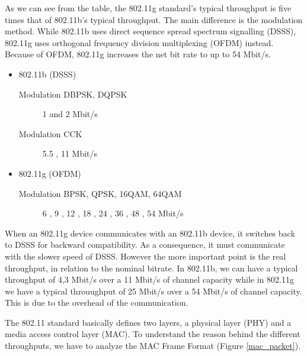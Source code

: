 	As we can see from the table, the 802.11g standard's typical throughput is five times that of 802.11b's typical throughput.  The main difference is the modulation method.  While 802.11b uses direct sequence spread spectrum signalling (DSSS), 802.11g uses orthogonal frequency division multiplexing (OFDM) instead.  Because of OFDM, 802.11g increases the net bit rate to up to 54 Mbit/s.
	
	\begin{itemize}
		\item 802.11b (DSSS)
			\begin{description}
				\item[Modulation DBPSK, DQPSK] 1 and 2 Mbit/s
				\item[Modulation CCK] 5.5 , 11 Mbit/s
			\end{description}
		\item 802.11g (OFDM)
			\begin{description}
				\item[Modulation BPSK, QPSK, 16QAM, 64QAM] 6 , 9 , 12 , 18 , 24 , 36 , 48 , 54 Mbit/s
			\end{description}
	\end{itemize}

	When an 802.11g device communicates with an 802.11b device, it switches back to DSSS for backward compatibility. As a consequence, it must communicate with the slower speed of DSSS.
	However the more important point is the real throughput, in relation to the nominal bitrate.
	In 802.11b, we can have a typical throughput of 4,3 Mbit/s over a 11 Mbit/s of channel capacity while in 802.11g we have a typical throuughput of 25 Mbit/s over a 54 Mbit/s of channel capacity. This is due to the overhead of the communication.
	
	The 802.11 standard basically defines two layers, a physical layer (PHY) and a media access control layer (MAC). To understand the reason behind the different throughputs, we have to analyze the MAC Frame Format (Figure \ref{mac_packet}).
	
